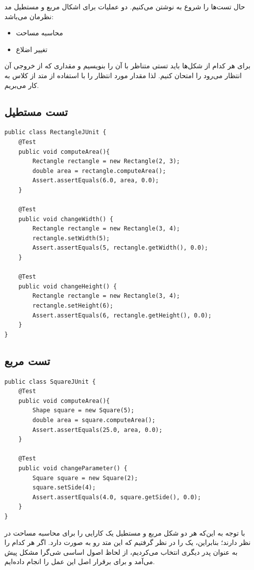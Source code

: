 حال تست‌ها را شروع به نوشتن می‌کنیم. دو عملیات برای اشکال مربع و مستطیل مد نظرمان می‌باشد: 
\begin{itemize}
	\item محاسبه مساحت
	\item تغییر اضلاع
\end{itemize}

برای هر کدام از شکل‌ها باید تستی متناظر با آن را بنویسیم و مقداری که از خروجی آن انتظار می‌رود را امتحان کنیم. لذا مقدار مورد انتظار را با استفاده از متد  از کلاس  به کار می‌بریم. 

\subsection*{تست مستطیل}
\begin{Verbatim}[tabsize=4]
public class RectangleJUnit {
	@Test
	public void computeArea(){
		Rectangle rectangle = new Rectangle(2, 3);
		double area = rectangle.computeArea();
		Assert.assertEquals(6.0, area, 0.0);
	}
	
	@Test
	public void changeWidth() {
		Rectangle rectangle = new Rectangle(3, 4);
		rectangle.setWidth(5);
		Assert.assertEquals(5, rectangle.getWidth(), 0.0);
	}
	
	@Test
	public void changeHeight() {
		Rectangle rectangle = new Rectangle(3, 4);
		rectangle.setHeight(6);
		Assert.assertEquals(6, rectangle.getHeight(), 0.0);
	}
}
\end{Verbatim}

\subsection*{تست مربع}
\begin{Verbatim}
public class SquareJUnit {
	@Test
	public void computeArea(){
		Shape square = new Square(5);
		double area = square.computeArea();
		Assert.assertEquals(25.0, area, 0.0);
	}
	
	@Test
	public void changeParameter() {
		Square square = new Square(2);
		square.setSide(4);
		Assert.assertEquals(4.0, square.getSide(), 0.0);
	}
}

\end{Verbatim}

\newpage
{}

با توجه به این‌که هر دو شکل مربع و مستطیل یک کارایی را برای محاسبه مساحت در نظر دارند؛ بنابراین، یک  را در نظر گرفتیم که این متد رو به صورت  دارد. اگر هر کدام را به عنوان پدر دیگری انتخاب می‌کردیم، از لحاظ اصول‌ اساسی شی‌گرا مشکل پیش می‌آمد و برای برقرار اصل  این عمل را انجام داده‌ایم.

